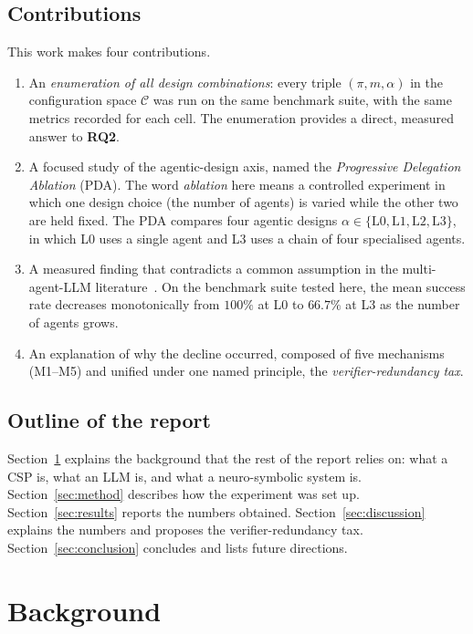 \documentclass[11pt,a4paper]{article}
\newcommand{\rqtwo}{\textbf{RQ2}}
\begin{document}
\subsection{Contributions}\label{sec:intro:contrib}
This work makes four contributions.
\begin{enumerate}[leftmargin=1.4em,topsep=2pt,itemsep=1pt]
  \item An \emph{enumeration of all design combinations}: every triple $(\pi, m, \alpha)$ in the configuration space $\mathcal{C}$ was run on the same benchmark suite, with the same metrics recorded for each cell. The enumeration provides a direct, measured answer to \rqtwo{}.
  \item A focused study of the agentic-design axis, named the \emph{Progressive Delegation Ablation} (PDA). The word \emph{ablation} here means a controlled experiment in which one design choice (the number of agents) is varied while the other two are held fixed. The PDA compares four agentic designs $\alpha \in \{\mathrm{L0}, \mathrm{L1}, \mathrm{L2}, \mathrm{L3}\}$, in which L0 uses a single agent and L3 uses a chain of four specialised agents.
  \item A measured finding that contradicts a common assumption in the multi-agent-LLM literature~\cite{R5,R6}. On the benchmark suite tested here, the mean success rate decreases monotonically from $100\%$ at L0 to $66.7\%$ at L3 as the number of agents grows.
  \item An explanation of why the decline occurred, composed of five mechanisms (M1--M5) and unified under one named principle, the \emph{verifier-redundancy tax}.
\end{enumerate}

\subsection{Outline of the report}\label{sec:intro:outline}
Section~\ref{sec:bg} explains the background that the rest of the report relies on: what a CSP is, what an LLM is, and what a neuro-symbolic system is. Section~\ref{sec:method} describes how the experiment was set up. Section~\ref{sec:results} reports the numbers obtained. Section~\ref{sec:discussion} explains the numbers and proposes the verifier-redundancy tax. Section~\ref{sec:conclusion} concludes and lists future directions.

\section{Background}\label{sec:bg}
\end{document}
